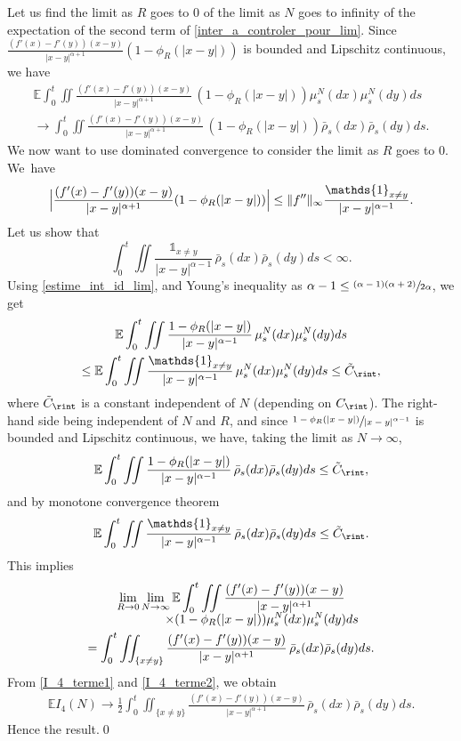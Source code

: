 Let us find the limit as $R$ goes to 0 of the limit as $N$ goes to infinity of the expectation of the second term of \eqref{inter_a_controler_pour_lim}. Since $\frac{(f'(x)-f'(y))(x-y)}{|x-y|^{\alpha+1}}(1-\phi_R(|x-y|))$ is bounded and Lipschitz continuous, we have
\begin{multline*}
\mathbb{E}\int_{0}^t\iint\frac{(f'(x)-f'(y))(x-y)}{|x-y|^{\alpha+1}}\,(1-\phi_R(|x-y|))\mu^N_s(dx)\mu^N_s(dy)ds\\
\to\int_{0}^t\iint\frac{(f'(x)-f'(y))(x-y)}{|x-y|^{\alpha+1}}\,(1-\phi_R(|x-y|))\bar{\rho}_s(dx)\bar{\rho}_s(dy)ds.
\end{multline*}
We now want to use dominated convergence to consider the limit as $R$ goes to $0$. We~have
\begin{align*}
\Bigl|\frac{(f'(x)-f'(y))(x-y)}{|x-y|^{\alpha+1}}(1-\phi_R(|x-y|))\Bigr|\leq \|f''\|_{\infty} \frac{\mathds{1}_{x\neq y}}{|x-y|^{\alpha-1}}.
\end{align*}
Let us show that
\[
\int_{0}^t\iint\frac{\mathds{1}_{x\neq y}}{|x-y|^{\alpha-1}}\,\bar{\rho}_s(dx)\bar{\rho}_s(dy)ds<\infty.
\]
Using \eqref{estime_int_id_lim}, and Young's inequality as ${\alpha-1\leq\sfrac{(\alpha-1)(\alpha+2)}{2\alpha}}$, we get
\begin{multline*}
\mathbb{E}\int_{0}^t\iint\frac{1-\phi_R(|x-y|)}{|x-y|^{\alpha-1}}\,\mu^N_s(dx)\mu^N_s(dy)ds\\
\leq \mathbb{E}\int_{0}^t\iint\frac{\mathds{1}_{x\neq y}}{|x-y|^{\alpha-1}}\,\mu^N_s(dx)\mu^N_s(dy)ds\leq \tilde{C}_{\rint},
\end{multline*}
where $\tilde{C}_{\rint}$ is a constant independent of $N$ (depending on $C_{\rint}$). The right-hand side being independent of $N$ and $R$, and since $\sfrac{1-\phi_R(|x-y|)}{|x-y|^{\alpha-1}}$ is bounded and Lipschitz continuous, we have, taking the limit as $N\to\infty$,
\begin{align*}
\mathbb{E}\int_{0}^t\iint\frac{1-\phi_R(|x-y|)}{|x-y|^{\alpha-1}}\,\bar{\rho}_s(dx)\bar{\rho}_s(dy)ds\leq \tilde{C}_{\rint},
\end{align*}
and by monotone convergence theorem
\begin{align*}
\mathbb{E}\int_{0}^t\iint\frac{\mathds{1}_{x\neq y}}{|x-y|^{\alpha-1}}\,\bar{\rho}_s(dx)\bar{\rho}_s(dy)ds\leq \tilde{C}_{\rint}.
\end{align*}
This implies
\begin{multline}
\lim_{R\to 0}\lim_{N\to \infty}\mathbb{E}\int_{0}^t\iint\frac{(f'(x)-f'(y))(x-y)}{|x-y|^{\alpha+1}}\\[-5pt]
\shoveright{\times(1-\phi_R(|x-y|))\mu^N_s(dx)\mu^N_s(dy)ds\hphantom{.}}\\
=\int_{0}^t\iint_{\{x\neq y\}}\frac{(f'(x)-f'(y))(x-y)}{|x-y|^{\alpha+1}}\,\bar{\rho}_s(dx)\bar{\rho}_s(dy)ds\label{I_4_terme2}.
\end{multline}
From \eqref{I_4_terme1} and \eqref{I_4_terme2}, we obtain
\begin{align*}
\mathbb{E}I_4(N)\to\frac{1}{2}\int_{0}^t\iint_{\{x\neq y\}}\frac{(f'(x)-f'(y))(x-y)}{|x-y|^{\alpha+1}}\,\bar{\rho}_s(dx)\bar{\rho}_s(dy)ds.
\end{align*}
Hence the result.\qed

